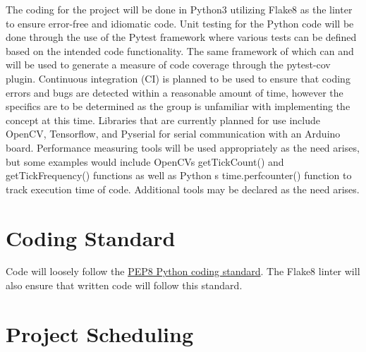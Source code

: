 \documentclass{article}
\begin{document}
The coding for the project will be done in Python3 utilizing Flake8 as the linter
to ensure error-free and idiomatic code. Unit testing for the Python code will be done
through the use of the Pytest framework where various tests can be defined based on the
intended code functionality. The same framework of which can and will be used to generate
a measure of code coverage through the pytest-cov plugin. Continuous integration (CI) is
planned to be used to ensure that coding errors and bugs are detected within a reasonable
amount of time, however the specifics are to be determined as the group is unfamiliar with
implementing the concept at this time. Libraries that are currently planned for use include
OpenCV, Tensorflow, and Pyserial for serial communication with an Arduino board. Performance
measuring tools will be used appropriately as the need arises, but some examples would include
OpenCV\textquotesingle s getTickCount() and getTickFrequency() functions as well as Python\textquotesingle
s time.perf\textunderscore counter() function to track execution time of code. Additional tools
may be declared as the need arises.

\section{Coding Standard}

Code will loosely follow the \href{https://peps.python.org/pep-0008/}{PEP8 Python coding standard}.
The Flake8 linter will also ensure that written code will follow this standard.

\section{Project Scheduling}

\end{document}
